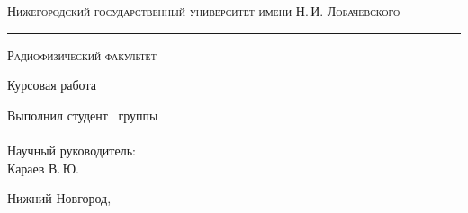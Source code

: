 \begin{titlepage}

\begin{center}

{\small\textsc{Нижегородский государственный университет имени Н.\,И. Лобачевского}}
\vskip 1pt \hrule \vskip 3pt
{\small\textsc{Радиофизический факультет}}



\vfill
{\Large {\department}}

{\Large Курсовая работа \vskip 12pt \bfseries \labtheme}
	
\end{center}

\vfill
	
\begin{flushright}
	{Выполнил студент \labgroup\ группы\\ \labauthors
	\\Научный руководитель:\\ Караев В.\,Ю.}
\end{flushright}
	
\vfill
	
\begin{center}
	Нижний Новгород, \the\year
\end{center}

\end{titlepage}

